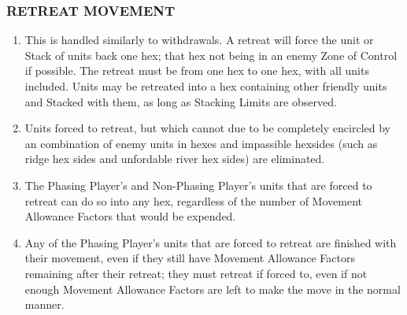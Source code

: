 \subsubsection{RETREAT MOVEMENT}

\begin{enumerate}
  \item This is handled similarly to withdrawals. A retreat will force the unit or Stack of units back one hex; that hex not being in an enemy Zone of Control if possible. The retreat must be from one hex to one hex, with all units included. Units may be retreated into a hex containing other friendly units and Stacked with them, as long as Stacking Limits are observed.

  \item Units forced to retreat, but which cannot due to be completely encircled by an combination of enemy units in hexes and impassible hexsides (such as ridge hex sides and unfordable river hex sides) are eliminated.

  \item The Phasing Player's and Non-Phasing Player's units that are forced to retreat can do so into any hex, regardless of the number of Movement Allowance Factors that would be expended.

  \item Any of the Phasing Player's units that are forced to retreat are finished with their movement, even if they still have Movement Allowance Factors remaining after their retreat; they must retreat if forced to, even if not enough Movement Allowance Factors are left to make the move in the normal manner.
\end{enumerate}